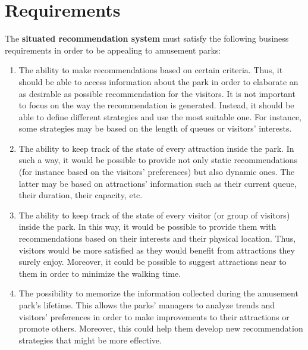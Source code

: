 \section{Requirements}\label{sec:requirements}

The \textbf{situated recommendation system} must satisfy the following business requirements in order to be appealing to amusement parks:
\begin{enumerate}
    \item The ability to make recommendations based on certain criteria.
    Thus, it should be able to access information about the park in order to elaborate an as desirable as possible recommendation for the visitors.
    It is not important to focus on the way the recommendation is generated.
    Instead, it should be able to define different strategies and use the most suitable one.
    For instance, some strategies may be based on the length of queues or visitors' interests.
    \item The ability to keep track of the state of every attraction inside the park.
    In such a way, it would be possible to provide not only static recommendations (for instance based on the visitors' preferences) but also dynamic ones.
    The latter may be based on attractions' information such as their current queue, their duration, their capacity, etc.
    \item The ability to keep track of the state of every visitor (or group of visitors) inside the park.
    In this way, it would be possible to provide them with recommendations based on their interests and their physical location.
    Thus, visitors would be more satisfied as they would benefit from attractions they surely enjoy.
    Moreover, it could be possible to suggest attractions near to them in order to minimize the walking time.
    \item The possibility to memorize the information collected during the amusement park's lifetime.
    This allows the parks' managers to analyze trends and visitors' preferences in order to make improvements to their attractions or promote others.
    Moreover, this could help them develop new recommendation strategies that might be more effective.
\end{enumerate}